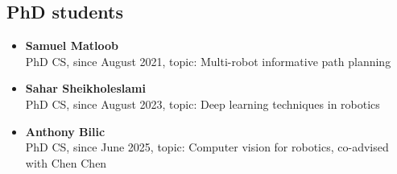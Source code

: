 \subsection*{PhD students}

\begin{itemize}
\item\textbf{Samuel Matloob} \\
PhD CS, since August 2021, topic: Multi-robot informative path planning 

\item\textbf{Sahar Sheikholeslami} \\
PhD CS, since August 2023, topic: Deep learning techniques in robotics 

\item\textbf{Anthony Bilic} \\
PhD CS, since June 2025, topic: Computer vision for robotics, co-advised with Chen Chen



\end{itemize}




    
    
    
    
    
    
    
